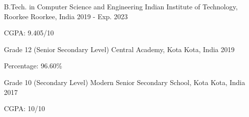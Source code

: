 

\begin{cventries}

  \cventry
    {B.Tech. in Computer Science and Engineering} %
    {Indian Institute of Technology, Roorkee} %
    {Roorkee, India} %
    {2019 - Exp. 2023} %
    {
      \begin{cvitems} %
        \item {CGPA: 9.405/10}
      \end{cvitems}
    }

  \cventry
    {Grade 12 (Senior Secondary Level)} %
    {Central Academy, Kota} %
    {Kota, India} %
    {2019} %
    {
      \begin{cvitems} %
        \item {Percentage: 96.60\%}
      \end{cvitems}
    }

  \cventry
    {Grade 10 (Secondary Level)} %
    {Modern Senior Secondary School, Kota} %
    {Kota, India} %
    {2017} %
    {
      \begin{cvitems} %
        \item {CGPA: 10/10}
      \end{cvitems}
    }

\end{cventries}
